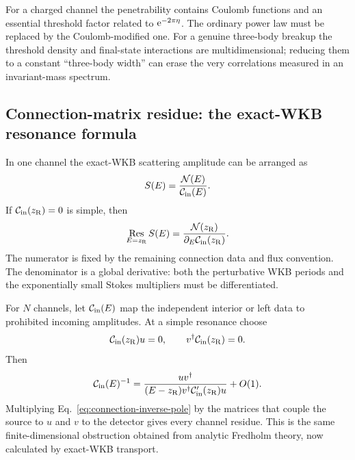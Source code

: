 For a charged channel the penetrability contains Coulomb functions and an
essential threshold factor related to $\mathrm{e}^{-2\pi\eta}$.  The ordinary
power law must be replaced by the Coulomb-modified one.  For a genuine
three-body breakup the threshold density and final-state interactions are
multidimensional; reducing them to a constant ``three-body width'' can erase
the very correlations measured in an invariant-mass spectrum.

\subsection{Connection-matrix residue: the exact-WKB resonance formula}
\label{subsec:connection-matrix-resonance-formula}

In one channel the exact-WKB scattering amplitude can be arranged as
\begin{equation}
  S(E)=\frac{\mathcal N(E)}{\mathcal{C}_{\mathrm{in}}(E)}.
  \label{eq:wkb-S-numerator-denominator}
\end{equation}
If $\mathcal{C}_{\mathrm{in}}(z_{\mathrm R})=0$ is simple, then
\begin{equation}
  \operatorname*{Res}_{E=z_{\mathrm R}}S(E)
  =\frac{\mathcal N(z_{\mathrm R})}
  {\partial_E\mathcal{C}_{\mathrm{in}}(z_{\mathrm R})}.
  \label{eq:wkb-S-residue-formula}
\end{equation}
The numerator is fixed by the remaining connection data and flux convention.
The denominator is a global derivative: both the perturbative WKB periods and
the exponentially small Stokes multipliers must be differentiated.

For $N$ channels, let $\mathcal{C}_{\mathrm{in}}(E)$ map the independent
interior or left data to prohibited incoming amplitudes.  At a simple
resonance choose
\begin{equation}
  \mathcal{C}_{\mathrm{in}}(z_{\mathrm R})u=0,
  \qquad
  v^\dagger\mathcal{C}_{\mathrm{in}}(z_{\mathrm R})=0.
  \label{eq:connection-left-right-null}
\end{equation}
Then
\begin{equation}
  \mathcal{C}_{\mathrm{in}}(E)^{-1}
  =\frac{u v^\dagger}
  {(E-z_{\mathrm R})
   v^\dagger\mathcal{C}_{\mathrm{in}}'(z_{\mathrm R})u}
  +O(1).
  \label{eq:connection-inverse-pole}
\end{equation}
Multiplying Eq.~\eqref{eq:connection-inverse-pole} by the matrices that
couple the source to $u$ and $v$ to the detector gives every channel residue.
This is the same finite-dimensional obstruction obtained from analytic
Fredholm theory, now calculated by exact-WKB transport.

